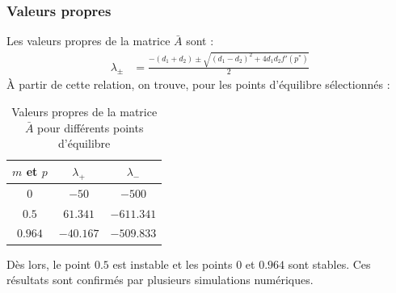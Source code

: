 \documentclass[a4paper, 12pt]{article}
\begin{document}
	\subsubsection{Valeurs propres}
	Les valeurs propres de la matrice $\bar{A}$ sont :
	\begin{align*}
		{\lambda}_{\pm} & = \frac{-\left({d}_{1} + {d}_{2}\right) \pm \sqrt{\left({d}_{1} - {d}_{2}\right)^{2} + 4{d}_{1}{d}_{2}{f'}({p}^{*})}}{2}
	\end{align*}
	\`{A} partir de cette relation, on trouve, pour les points d'équilibre sélectionnés :
	\begin{table}[H]
		\centering
		\begin{tabular}{| c | c | c |}
			\hline
			$m$ et $p$ & $\lambda_{+}$ & $\lambda_{-}$ \\ \hline\hline
			$0$        & $-50$         & $-500$        \\ \hline
			$0.5$      & $61.341$      & $-611.341$    \\ \hline
			$0.964$    & $-40.167$     & $-509.833$    \\ \hline
		\end{tabular}
		\caption{Valeurs propres de la matrice $\bar{A}$ pour différents points d'équilibre}
	\end{table}
	Dès lors, le point $0.5$ est instable et les points $0$ et $0.964$ sont stables. Ces résultats sont confirmés par plusieurs simulations numériques.
\end{document}
